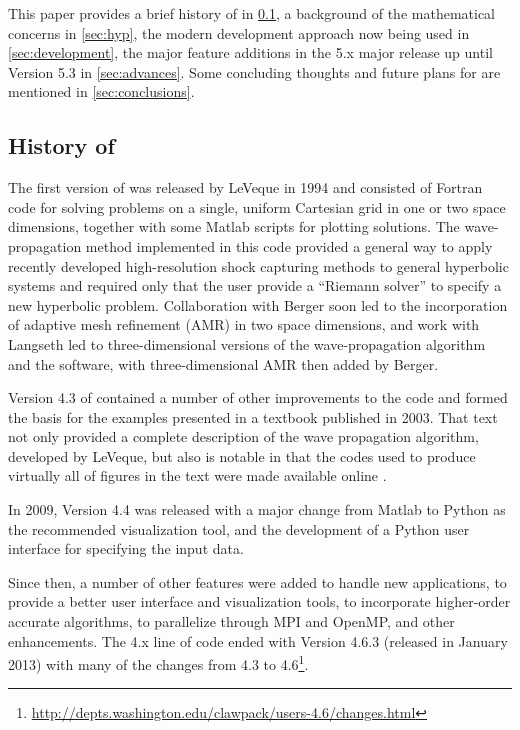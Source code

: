 This paper provides a brief history of \clawpack in
\cref{sub:history}, a background of the mathematical concerns in \cref{sec:hyp},
the modern development approach now being used in \cref{sec:development},
the major feature additions in the \clawpack 5.x major release up until Version 5.3 in
\cref{sec:advances}. Some concluding thoughts and future plans for
\clawpack are mentioned in
\cref{sec:conclusions}.

\subsection{History of \clawpack} \label{sub:history}

The first version of \clawpack was released by LeVeque in 1994
\cite{clawpack-v1} and consisted of Fortran code for solving problems on a
single, uniform Cartesian
grid in one or two space dimensions, together with some Matlab
\cite{MATLAB:2015a} scripts
for plotting solutions. The wave-propagation method implemented
in this code provided a general way to apply recently developed
high-resolution shock capturing methods to general hyperbolic systems and
required only that the user provide a ``Riemann solver'' to specify a new
hyperbolic problem.
Collaboration with Berger \cite{mjb-rjl:amrclaw}
soon led to the incorporation of adaptive mesh refinement (AMR) in two space
dimensions, and work with Langseth \cite{jol-rjl:3d, jol:thesis}
led to three-dimensional versions of the wave-propagation algorithm and the
software, with three-dimensional AMR then added by Berger.

Version 4.3 of \clawpack contained a number of other improvements to
the code and formed the basis for the examples presented in a textbook
\cite{rjl:fvmhp} published in 2003.  That text not only provided a
complete description of the wave propagation algorithm, developed by LeVeque,
but also is notable in that the codes used to produce virtually all of figures
in the text were made available online \cite{rjl:fvmhp}.

In 2009, \clawpack Version 4.4 was released with a major change from Matlab
to Python as the recommended visualization tool, and the development
of a Python user interface for specifying the input data.

Since then, a number of other features were added to handle new applications, to
provide a better user interface and visualization tools, to incorporate
higher-order accurate algorithms, to parallelize through MPI and OpenMP, and
other enhancements. The \clawpack 4.x line of code ended with Version 4.6.3
(released in January 2013) with many of the changes from 4.3 to 4.6\footnote{
\url{http://depts.washington.edu/clawpack/users-4.6/changes.html}}.

